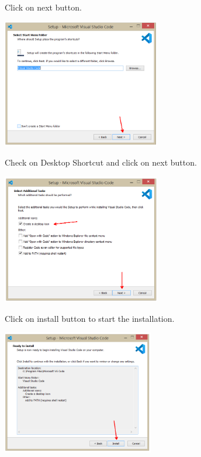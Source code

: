 \documentclass{article}
\begin{document}
 
\noindent Click on next button.
 

\begin{center}
	\noindent \includegraphics*[width=2.72in, height=2.22in]{IMG-06-20}
\end{center}

 
\noindent Check on Desktop Shortcut and click on next button.
 

\begin{center}
	\noindent \includegraphics*[width=2.72in, height=2.23in]{IMG-06-21}
\end{center}

 
   Click on install button to start the installation.
 

\begin{center}
	\noindent \includegraphics*[width=2.60in, height=2.14in]{IMG-06-22}
\end{center}
\end{document}
